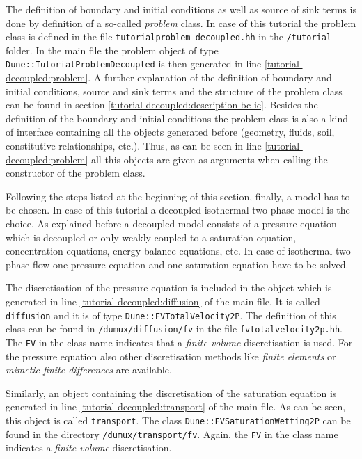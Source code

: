The definition of boundary and initial conditions as well as source of sink terms is done by definition of a so-called \textit{problem} class. In case of this tutorial the problem class is defined in the file \texttt{tutorialproblem\_decoupled.hh} in the \texttt{/tutorial} folder. In the main file the problem object of type \texttt{Dune::TutorialProblemDecoupled} is then generated in line \ref{tutorial-decoupled:problem}. A further explanation of the definition of boundary and initial conditions, source and sink terms and the structure of the problem class can be found in section \ref{tutorial-decoupled:description-bc-ic}. Besides the definition of the boundary and initial conditions the problem class is also a kind of interface containing all the objects generated before (geometry, fluids, soil, constitutive relationships, etc.). Thus, as can be seen in line \ref{tutorial-decoupled:problem} all this objects are given as arguments when calling the constructor of the problem class.

Following the steps listed at the beginning of this section, finally, a model has to be chosen. In case of this tutorial a decoupled isothermal two phase model is the choice. As explained before a decoupled model consists of a pressure equation which is decoupled or only weakly coupled to a saturation equation, concentration equations, energy balance equations, etc. In case of isothermal two phase flow one pressure equation and one saturation equation have to be solved. 

The discretisation of the pressure equation is included in the object which is generated in line \ref{tutorial-decoupled:diffusion} of the main file. It is called \texttt{diffusion} and it is of type \texttt{Dune::FVTotalVelocity2P}. The definition of this class can be found in \texttt{/dumux/diffusion/fv} in the file \texttt{fvtotalvelocity2p.hh}. The \texttt{FV} in the class name indicates that a \textit{finite volume} discretisation is used. For the pressure equation also other discretisation methods like \textit{finite elements} or \textit{mimetic finite differences} are available.

Similarly, an object containing the discretisation of the saturation equation is generated in line \ref{tutorial-decoupled:transport} of the main file. As can be seen, this object is called \texttt{transport}. The class  \texttt{Dune::FVSaturationWetting2P} can be found in the directory \texttt{/dumux/transport/fv}. Again, the \texttt{FV} in the class name indicates a \textit{finite volume} discretisation.

